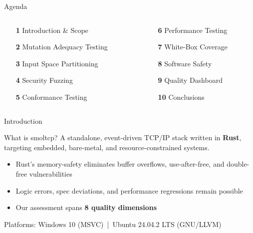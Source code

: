 \documentclass[aspectratio=169,11pt]{beamer}
\begin{document}
\begin{frame}{Agenda}
\begin{columns}[T]
\begin{column}{0.48\textwidth}
  \begin{enumerate}
    \item[\textcolor{maingreen}{\textbf{1}}] Introduction \& Scope
    \item[\textcolor{maingreen}{\textbf{2}}] Mutation Adequacy Testing
    \item[\textcolor{maingreen}{\textbf{3}}] Input Space Partitioning
    \item[\textcolor{maingreen}{\textbf{4}}] Security Fuzzing
    \item[\textcolor{maingreen}{\textbf{5}}] Conformance Testing
  \end{enumerate}
\end{column}
\begin{column}{0.48\textwidth}
  \begin{enumerate}
    \item[\textcolor{maingreen}{\textbf{6}}] Performance Testing
    \item[\textcolor{maingreen}{\textbf{7}}] White-Box Coverage
    \item[\textcolor{maingreen}{\textbf{8}}] Software Safety
    \item[\textcolor{maingreen}{\textbf{9}}] Quality Dashboard
    \item[\textcolor{maingreen}{\textbf{10}}] Conclusions
  \end{enumerate}
\end{column}
\end{columns}
\end{frame}

\begin{frame}{Introduction}
\begin{block}{What is smoltcp?}
A standalone, event-driven TCP/IP stack written in \textbf{Rust}, targeting embedded, bare-metal, and resource-constrained systems.
\end{block}
\vspace{0.3cm}
\begin{itemize}
  \item Rust's memory-safety eliminates buffer overflows, use-after-free, and double-free vulnerabilities
  \item Logic errors, spec deviations, and performance regressions remain possible
  \item Our assessment spans \textbf{8 quality dimensions}
\end{itemize}
\vspace{0.3cm}
\textcolor{subtletext}{\small Platforms: Windows 10 (MSVC)~|~Ubuntu 24.04.2 LTS (GNU/LLVM)}
\end{frame}
\end{document}
